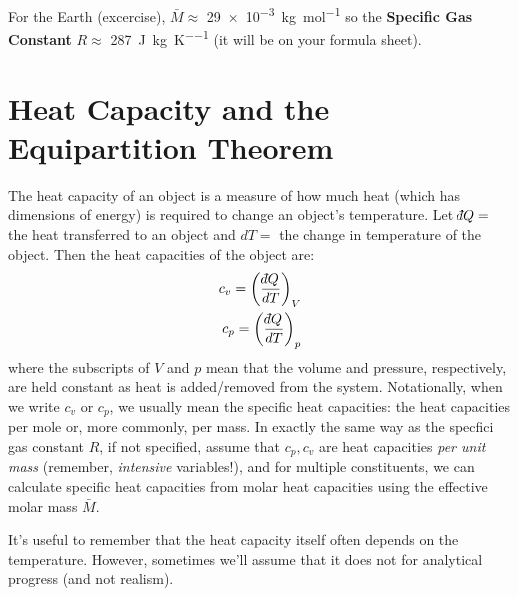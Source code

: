 For the Earth (excercise), $\bar{M}\approx$ \qty{29e-3}{\kilogram\per\mole} so the \textbf{Specific Gas Constant} $R\approx$ \qty{287}{\joule\per\kilogram\per\kelvin} (it will be on your formula sheet).


\section{Heat Capacity and the Equipartition Theorem}\label{Equipartition}

The heat capacity of an object is a measure of how much heat (which has dimensions of energy) is required to change an object's temperature. Let  $\dbar Q=$ the heat transferred to an object and $dT=$ the change in temperature of the object. Then the heat capacities of the object are:
\begin{align}
    c_v=\left(\frac{\dbar Q}{dT}\right)_V\\
    c_p=\left(\frac{\dbar Q}{dT}\right)_p
\end{align}
where the subscripts of $V$ and $p$ mean that the volume and pressure, respectively, are held constant as heat is added/removed from the system. Notationally, when we write $c_v$ or $c_p$, we usually mean the specific heat capacities: the heat capacities per mole or, more commonly, per mass. In exactly the same way as the specfici gas constant $R$, if not specified, assume that $c_p, c_v$ are heat capacities \textit{per unit mass} (remember, \textit{intensive} variables!), and for multiple constituents, we can calculate specific heat capacities from molar heat capacities using the effective molar mass $\bar{M}$.

It's useful to remember that the heat capacity itself often depends on the temperature. However, sometimes we'll assume that it does not for analytical progress (and not realism).

